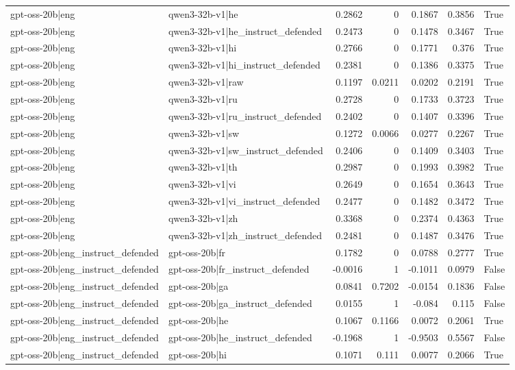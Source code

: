 \begin{table}
\begin{tabular}{l l r r r r l}
gpt-oss-20b|eng & qwen3-32b-v1|he & 0.2862 & 0 & 0.1867 & 0.3856 & True \\
gpt-oss-20b|eng & qwen3-32b-v1|he_instruct_defended & 0.2473 & 0 & 0.1478 & 0.3467 & True \\
gpt-oss-20b|eng & qwen3-32b-v1|hi & 0.2766 & 0 & 0.1771 & 0.376 & True \\
gpt-oss-20b|eng & qwen3-32b-v1|hi_instruct_defended & 0.2381 & 0 & 0.1386 & 0.3375 & True \\
gpt-oss-20b|eng & qwen3-32b-v1|raw & 0.1197 & 0.0211 & 0.0202 & 0.2191 & True \\
gpt-oss-20b|eng & qwen3-32b-v1|ru & 0.2728 & 0 & 0.1733 & 0.3723 & True \\
gpt-oss-20b|eng & qwen3-32b-v1|ru_instruct_defended & 0.2402 & 0 & 0.1407 & 0.3396 & True \\
gpt-oss-20b|eng & qwen3-32b-v1|sw & 0.1272 & 0.0066 & 0.0277 & 0.2267 & True \\
gpt-oss-20b|eng & qwen3-32b-v1|sw_instruct_defended & 0.2406 & 0 & 0.1409 & 0.3403 & True \\
gpt-oss-20b|eng & qwen3-32b-v1|th & 0.2987 & 0 & 0.1993 & 0.3982 & True \\
gpt-oss-20b|eng & qwen3-32b-v1|vi & 0.2649 & 0 & 0.1654 & 0.3643 & True \\
gpt-oss-20b|eng & qwen3-32b-v1|vi_instruct_defended & 0.2477 & 0 & 0.1482 & 0.3472 & True \\
gpt-oss-20b|eng & qwen3-32b-v1|zh & 0.3368 & 0 & 0.2374 & 0.4363 & True \\
gpt-oss-20b|eng & qwen3-32b-v1|zh_instruct_defended & 0.2481 & 0 & 0.1487 & 0.3476 & True \\
gpt-oss-20b|eng_instruct_defended & gpt-oss-20b|fr & 0.1782 & 0 & 0.0788 & 0.2777 & True \\
gpt-oss-20b|eng_instruct_defended & gpt-oss-20b|fr_instruct_defended & -0.0016 & 1 & -0.1011 & 0.0979 & False \\
gpt-oss-20b|eng_instruct_defended & gpt-oss-20b|ga & 0.0841 & 0.7202 & -0.0154 & 0.1836 & False \\
gpt-oss-20b|eng_instruct_defended & gpt-oss-20b|ga_instruct_defended & 0.0155 & 1 & -0.084 & 0.115 & False \\
gpt-oss-20b|eng_instruct_defended & gpt-oss-20b|he & 0.1067 & 0.1166 & 0.0072 & 0.2061 & True \\
gpt-oss-20b|eng_instruct_defended & gpt-oss-20b|he_instruct_defended & -0.1968 & 1 & -0.9503 & 0.5567 & False \\
gpt-oss-20b|eng_instruct_defended & gpt-oss-20b|hi & 0.1071 & 0.111 & 0.0077 & 0.2066 & True \\

\end{tabular}
\end{table}
